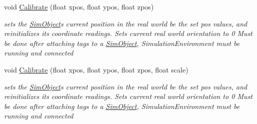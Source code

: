 \begin{DoxyCompactItemize}
void \hyperlink{class_pozyx_positioner_1_1_framework_1_1_sim_object_ad5e3a7c3290c1925d0e7d42a6e8b0111}{Calibrate} (float xpos, float ypos, float zpos)
\begin{DoxyCompactList}\small\item\em sets the \hyperlink{class_pozyx_positioner_1_1_framework_1_1_sim_object}{Sim\+Object}\textquotesingle{}s current position in the real world be the set pos values, and reinitializes its coordinate readings. Sets current real world orientation to 0 Must be done after attaching tags to a \hyperlink{class_pozyx_positioner_1_1_framework_1_1_sim_object}{Sim\+Object}, Simulation\+Environment must be running and connected \end{DoxyCompactList}\item 
void \hyperlink{class_pozyx_positioner_1_1_framework_1_1_sim_object_a7e07ca972f9fc7a962468f9746f9de72}{Calibrate} (float xpos, float ypos, float zpos, float scale)
\begin{DoxyCompactList}\small\item\em sets the \hyperlink{class_pozyx_positioner_1_1_framework_1_1_sim_object}{Sim\+Object}\textquotesingle{}s current position in the real world be the set pos values, and reinitializes its coordinate readings. Sets current real world orientation to 0 Must be done after attaching tags to a \hyperlink{class_pozyx_positioner_1_1_framework_1_1_sim_object}{Sim\+Object}, Simulation\+Environment must be running and connected \end{DoxyCompactList}\end{DoxyCompactItemize}
